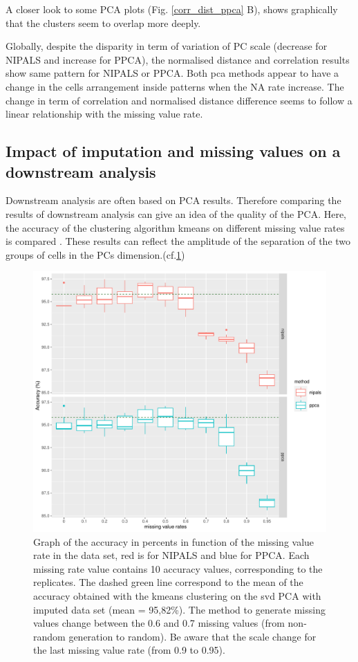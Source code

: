 \documentclass[a4paper, 11pt, twocolumn]{article}
\begin{document}
A closer look to some PCA plots (Fig. \ref{corr_dist_ppca} B), shows graphically that the clusters seem to overlap more deeply.


Globally, despite the disparity in term of variation of PC scale (decrease for NIPALS and increase for PPCA), the normalised distance and correlation results show same pattern for NIPALS or PPCA. Both pca methods appear to have a change in the cells arrangement inside patterns when the NA rate increase.  The change in term of correlation and normalised distance difference seems to follow a linear relationship with the missing value rate.  


\subsection{Impact of imputation and missing values on a downstream analysis}

Downstream analysis are often based on PCA results. Therefore comparing the results of downstream analysis can give an idea of the quality of the PCA. Here, the accuracy of the clustering algorithm kmeans on different missing value rates is compared \citep{Rlang}. These results can reflect the amplitude of the separation of the two groups of cells in the PCs dimension.(cf.\ref{accuracy_plot}) 

\begin{figure}[!ht]
    \centering
    \includegraphics[width = \linewidth]{replication_3_no_random_acc.pdf}
    \caption{\small Graph of the accuracy in percents in function of the missing value rate in the data set, red is for NIPALS and blue for PPCA. \scriptsize Each missing rate value contains 10 accuracy values, corresponding to the replicates. The dashed green line correspond to the mean of the accuracy obtained with the kmeans clustering on the svd PCA with imputed data set (mean = 95,82\%). The method to generate missing values change between the 0.6 and 0.7 missing values (from non-random generation to random). Be aware that the scale change for the last missing value rate (from 0.9 to 0.95).}
    \label{accuracy_plot}
\end{figure}
\end{document}
